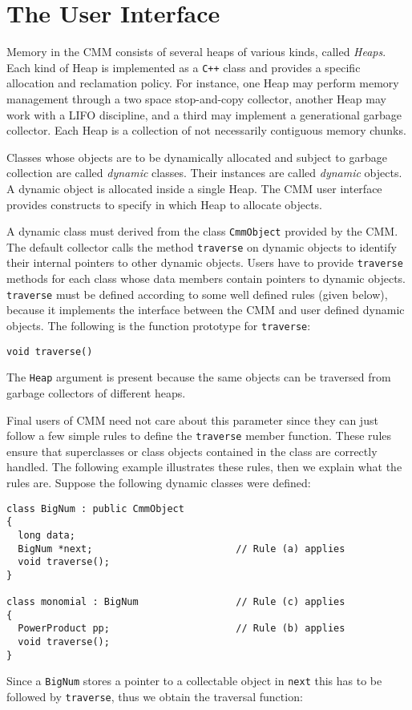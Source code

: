 \section{The User Interface}

Memory in the CMM consists of several heaps of various kinds, called {\em
  Heaps}.  Each kind of Heap is implemented as a {\tt C++} class and provides
a specific allocation and reclamation policy.  For instance, one Heap may
perform memory management through a two space stop-and-copy collector, another
Heap may work with a LIFO discipline, and a third may implement a generational
garbage collector.  Each Heap is a collection of not necessarily contiguous
memory chunks.

Classes whose objects are to be dynamically allocated and subject to garbage
collection are called {\em dynamic\/} classes.  Their instances are called {\em
dynamic\/} objects.  A dynamic object is allocated inside a single Heap.
The CMM user interface provides constructs to specify in which Heap to
allocate objects.


A dynamic class must derived from the class {\tt CmmObject} provided by the CMM.
The default collector calls the method {\tt traverse} on dynamic objects to
identify their internal pointers to other dynamic objects.  Users have to
provide {\tt traverse} methods for each class whose data members contain
pointers to dynamic objects.  {\tt traverse} must be defined according to some
well defined rules (given below), because it implements the interface between
the CMM and user defined dynamic objects.  The following is the function
prototype for {\tt traverse}:
\begin{verbatim}
void traverse()
\end{verbatim}
The {\tt Heap} argument is present because the same objects can be traversed
from garbage collectors of different heaps.

Final users of CMM need not care about this parameter since they can just
follow a few simple rules to define the {\tt traverse} member function.  These
rules ensure that superclasses or class objects contained in the class are
correctly handled.  The following example illustrates these rules, then we
explain what the rules are.  Suppose the following dynamic classes were
defined:
\begin{verbatim}
class BigNum : public CmmObject
{
  long data;
  BigNum *next;                         // Rule (a) applies
  void traverse();
}

class monomial : BigNum                 // Rule (c) applies
{
  PowerProduct pp;                      // Rule (b) applies
  void traverse();
}
\end{verbatim}
Since a {\tt BigNum} stores a pointer to a collectable object in {\tt next}
this has to be followed by {\tt traverse}, thus we obtain the traversal
function:

